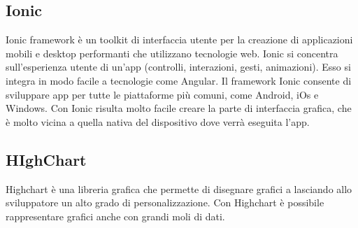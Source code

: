 \documentclass{article}
\begin{document}
\subsection{Ionic}
Ionic framework è un toolkit  di interfaccia utente per la creazione di  applicazioni mobili e desktop performanti che utilizzano tecnologie web.
Ionic si concentra sull'esperienza utente di un'app (controlli, interazioni, gesti, animazioni). Esso si integra in modo facile a tecnologie come Angular.
Il framework Ionic consente di sviluppare app per tutte le piattaforme più comuni, come Android, iOs e Windows. Con Ionic risulta molto facile creare la parte di interfaccia grafica, che è molto vicina a quella nativa del dispositivo dove verrà eseguita l'app.
\subsection{HIghChart}
Highchart è una libreria grafica che permette di disegnare grafici a lasciando allo sviluppatore un alto grado di personalizzazione. Con Highchart è possibile rappresentare grafici anche con grandi moli di dati.
\newpage
\nocite{*}
\printbibliography[heading = bibintoc]
\end{document}
